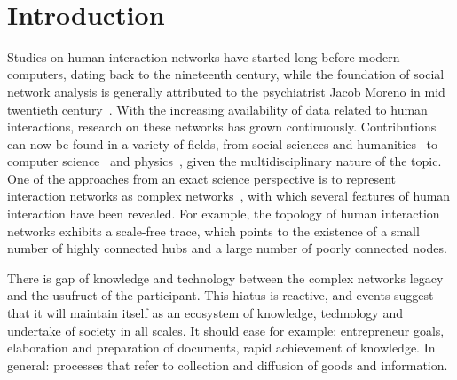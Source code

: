 \documentclass[a4paper,openright,12pt]{report} %
\begin{document}
  

%
%


\newpage\ \thispagestyle{empty}  \newpage\thispagestyle{empty}

\tableofcontents\thispagestyle{empty}\thispagestyle{empty}%

\clearpage \thispagestyle{empty}

\pagestyle{fancy}

\chapter{Introduction}
Studies on human interaction networks have started long before modern computers, dating back to the nineteenth century, while the foundation of
social network analysis is generally attributed to the psychiatrist Jacob Moreno in mid twentieth century~\cite{newmanBook}.
With the increasing availability of data related to human interactions, research on these networks has grown continuously.
Contributions can now be found in a variety of fields, from social sciences and humanities~\cite{latour2013} to computer science~\cite{bird} and physics~\cite{barabasiHumanDyn,newmanFriendship}, given the multidisciplinary nature of the topic.
One of the approaches from an exact science perspective is to represent interaction networks as complex networks~\cite{barabasiHumanDyn,newmanFriendship}, with which 
several features of human interaction have been revealed.
For example, the topology of human interaction networks exhibits a scale-free trace, which points to the existence of a small number of highly connected hubs and a large number of poorly connected nodes.

There is gap of knowledge and technology between the complex networks legacy and the usufruct of the participant. This hiatus is reactive, and events suggest that it will maintain itself as an ecosystem of knowledge, technology and undertake of society in all scales. It should ease for example: entrepreneur goals, elaboration and preparation of documents, rapid achievement of knowledge. In general: processes that refer to collection and diffusion of goods and information.
\end{document}
